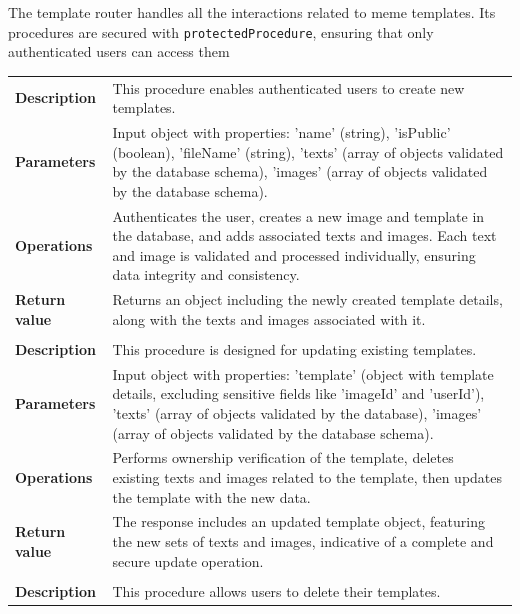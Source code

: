 The template router handles all the interactions related to meme templates. Its procedures are secured with \texttt{protectedProcedure}, ensuring that only authenticated users can access them

\noindent
\begin{longtable}{@{}>{\raggedright\arraybackslash}p{3cm} p{11cm}}
    \hline
    \multicolumn{2}{c}{\textbf{createTemplate}}
    \\
    \hline
    \textbf{Description}  & This procedure enables authenticated users to create new templates.
    \\
    \textbf{Parameters}   & Input object with properties: 'name' (string), 'isPublic' (boolean), 'fileName' (string), 'texts' (array of objects validated by the database schema), 'images' (array of objects validated by the database schema).
    \\
    \textbf{Operations}   & Authenticates the user, creates a new image and template in the database, and adds associated texts and images. Each text and image is validated and processed individually, ensuring data integrity and consistency.
    \\
    \textbf{Return value} & Returns an object including the newly created template details, along with the texts and images associated with it.
    \\
    \hline
    \multicolumn{2}{c}{\textbf{updateTemplate}}
    \\
    \hline
    \textbf{Description}  & This procedure is designed for updating existing templates.
    \\
    \textbf{Parameters}   & Input object with properties: 'template' (object with template details, excluding sensitive fields like 'imageId' and 'userId'), 'texts' (array of objects validated by the database), 'images' (array of objects validated by the database schema).
    \\
    \textbf{Operations}   & Performs ownership verification of the template, deletes existing texts and images related to the template, then updates the template with the new data.
    \\
    \textbf{Return value} & The response includes an updated template object, featuring the new sets of texts and images, indicative of a complete and secure update operation.
    \\
    \hline
    \multicolumn{2}{c}{\textbf{deleteTemplate}}
    \\
    \hline
    \textbf{Description}  & This procedure allows users to delete their templates.

\end{longtable}
